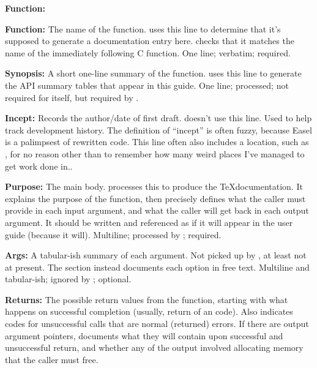 \begin{sreitems}{\textbf{Function:}}
\item[\textbf{Function:}] 
  The name of the function.   uses this line to
  determine that it's supposed to generate a documentation entry here.
   checks that it matches the name of the immediately
  following C function. One line; verbatim; required.

\item[\textbf{Synopsis:}] 
  A short one-line summary of the function.  uses this
  line to generate the API summary tables that appear in this guide.
  One line; processed; not required for  itself, but
  required by . 

\item[\textbf{Incept:}] Records the author/date of first
  draft.  doesn't use this line.  Used to help track
  development history. The definition of ``incept'' is often fuzzy,
  because Easel is a palimpsest of rewritten code. This line often
  also includes a location, such as ,
  for no reason other than to remember how many weird places I've
  managed to get work done in..

\item[\textbf{Purpose:}] The main body.  processes this
  to produce the \TeX documentation. It explains the purpose of the
  function, then precisely defines what the caller must provide in
  each input argument, and what the caller will get back in each
  output argument. It should be written and referenced as if it will
  appear in the user guide (because it will). Multiline; processed by
  ; required.

\item[\textbf{Args:}] A tabular-ish summary of each argument. Not
  picked up by , at least not at present. The
   section instead documents each option in free text.
  Multiline and tabular-ish; ignored by ; optional.

\item[\textbf{Returns:}] The possible return values from the function,
  starting with what happens on successful completion (usually, return
  of an  code). Also indicates codes for unsuccessful
  calls that are normal (returned) errors. If there are output
  argument pointers, documents what they will contain upon successful
  and unsuccessful return, and whether any of the output involved
  allocating memory that the caller must free.


\end{sreitems}
